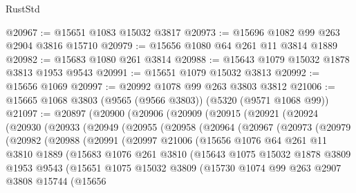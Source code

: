 \begin{lexlean}{RustStd}
\begin{coremodule}
@20967 := @15651 @1083 @15032 @3817
@20973 := @15696 @1082 @99 @263 @2904 @3816 @15710
@20979 := @15656 @1080 @64 @261 @11 @3814 @1889
@20982 := @15683 @1080 @261 @3814
@20988 := @15643 @1079 @15032 @1878 @3813 @1953 @9543
@20991 := @15651 @1079 @15032 @3813
@20992 := @15656 @1069
@20997 := @20992 @1078 @99 @263 @3803 @3812
@21006 := @15665 @1068 @3803 (@9565 (@9566 @3803)) (@5320 (@9571 @1068 @99))
@21097 := @20897
    (@20900
      (@20906
        (@20909
          (@20915
            (@20921
              (@20924
                (@20930
                  (@20933
                    (@20949
                      (@20955
                        (@20958
                          (@20964
                            (@20967
                              (@20973
                                (@20979
                                  (@20982
                                    (@20988
                                      (@20991
                                        (@20997
                                          @21006
                                          (@15656
                                            @1076
                                            @64
                                            @261
                                            @11
                                            @3810
                                            @1889
                                            (@15683
                                              @1076
                                              @261
                                              @3810
                                              (@15643
                                                @1075
                                                @15032
                                                @1878
                                                @3809
                                                @1953
                                                @9543
                                                (@15651
                                                  @1075
                                                  @15032
                                                  @3809
                                                  (@15730
                                                    @1074
                                                    @99
                                                    @263
                                                    @2907
                                                    @3808
                                                    @15744
                                                    (@15656

\end{coremodule}
\end{lexlean}

